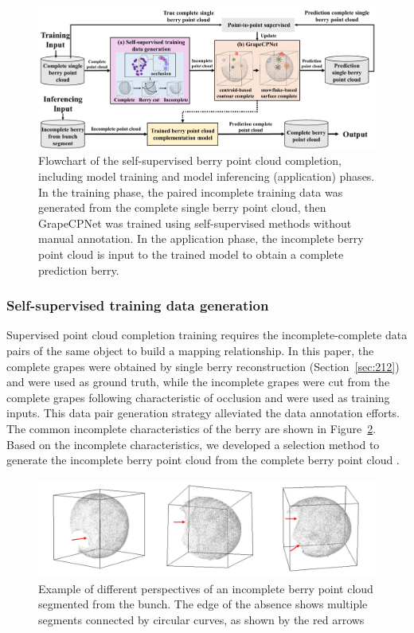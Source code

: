 \documentclass[12pt]{article}
\begin{document}
\begin{figure}[hbt!]
    \centering
    \includegraphics[width=1\textwidth]{figures/Figure7.pdf}
    \caption{Flowchart of the self-supervised berry point cloud completion, including model training and model inferencing (application) phases. In the training phase, the paired incomplete training data was generated from the complete single berry point cloud, then GrapeCPNet was trained using self-supervised methods without manual annotation. In the application phase, the incomplete berry point cloud is input to the trained model to obtain a complete prediction berry.}
    \label{fig:raw3}
\end{figure}

\subsubsection{Self-supervised training data generation}

Supervised point cloud completion training requires the incomplete-complete data pairs of the same object to build a mapping relationship. 
In this paper, the complete grapes were obtained by single berry reconstruction (Section~\ref{sec:212}) and were used as ground truth, while the incomplete grapes were cut from the complete grapes following characteristic of occlusion and were used as training inputs. 
This data pair generation strategy alleviated the data annotation efforts. The common incomplete characteristics of the berry are shown in Figure~\ref{fig:raw4}.
Based on the incomplete characteristics, we developed a selection method to generate the incomplete berry point cloud from the complete berry point cloud .

\begin{figure}[hbt!]
    \centering
    \includegraphics[width=1\textwidth]{figures/Figure8.pdf}
    \caption{Example of different perspectives of an incomplete berry point cloud segmented from the bunch. The edge of the absence shows multiple segments connected by circular curves, as shown by the red arrows}
    \label{fig:raw4}
\end{figure}
\end{document}
